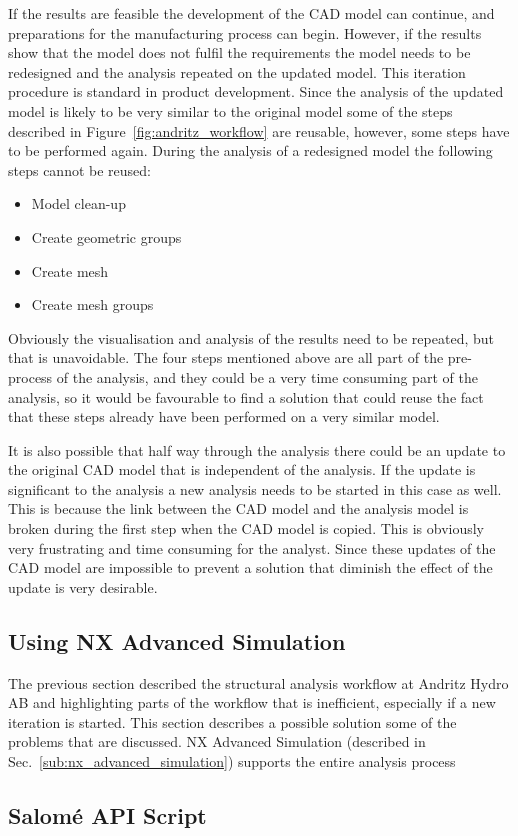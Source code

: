 If the results are feasible the development of the CAD model can continue, and preparations for the manufacturing process can begin. However, if the results show that the model does not fulfil the requirements the model needs to be redesigned and the analysis repeated on the updated model. This iteration procedure is standard in product development. Since the analysis of the updated model is likely to be very similar to the original model some of the steps described in Figure~\ref{fig:andritz_workflow} are reusable, however, some steps have to be performed again. During the analysis of a redesigned model the following steps cannot be reused:
\begin{itemize}
	\item Model clean-up
	\item Create geometric groups
	\item Create mesh
	\item Create mesh groups
\end{itemize}
Obviously the visualisation and analysis of the results need to be repeated, but that is unavoidable. The four steps mentioned above are all part of the pre-process of the analysis, and they could be a very time consuming part of the analysis, so it would be favourable to find a solution that could reuse the fact that these steps already have been performed on a very similar model. 

It is also possible that half way through the analysis there could be an update to the original CAD model that is independent of the analysis. If the update is significant to the analysis a new analysis needs to be started in this case as well. This is because the link between the CAD model and the analysis model is broken during the first step when the CAD model is copied. This is obviously very frustrating and time consuming for the analyst. Since these updates of the CAD model are impossible to prevent a solution that diminish the effect of the update is very desirable.

\subsection{Using NX Advanced Simulation} %
\label{sub:using_nx_advanced_simulation}
The previous section described the structural analysis workflow at Andritz Hydro AB and highlighting parts of the workflow that is inefficient, especially if a new iteration is started. This section describes a possible solution some of the problems that are discussed. NX Advanced Simulation (described in Sec.~\ref{sub:nx_advanced_simulation}) supports the entire analysis process 

\subsection{Salomé API Script} %
\label{sub:salom_api_script}





